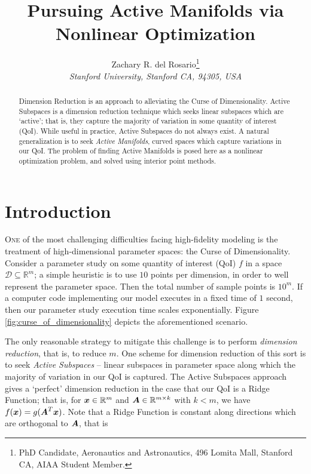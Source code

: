 \documentclass[]{aiaa-tc}%
\title{Pursuing Active Manifolds via Nonlinear Optimization}
\author{
  Zachary R. del Rosario\thanks{PhD Candidate, Aeronautics and Astronautics, 496 Lomita Mall, Stanford CA, AIAA Student Member.}\\
  {\normalsize\itshape
   Stanford University, Stanford CA, 94305, USA}\\
 }
\newcommand{\dom}{\mathcal{D}}
\begin{document}
\maketitle

\begin{abstract}
Dimension Reduction is an approach to alleviating the Curse of Dimensionality. Active Subspaces is a dimension reduction technique which seeks linear subspaces which are `active'; that is, they capture the majority of variation in some quantity of interest (QoI). While useful in practice, Active Subspaces do not always exist. A natural generalization is to seek \emph{Active Manifolds}, curved spaces which capture variations in our QoI. The problem of finding Active Manifolds is posed here as a nonlinear optimization problem, and solved using interior point methods.
\end{abstract}

\printnomenclature %

\section{Introduction} \label{sec:introduction}

\lettrine[nindent=0pt]{O}{ne} of the most challenging difficulties facing high-fidelity modeling is the treatment of high-dimensional parameter spaces: the Curse of Dimensionality. Consider a parameter study on some quantity of interest (QoI) $f$ in a space $\dom\subseteq\mathbb{R}^m$; a simple heuristic is to use $10$ points per dimension, in order to well represent the parameter space. Then the total number of sample points is $10^m$. If a computer code implementing our model executes in a fixed time of $1$ second, then our parameter study execution time scales exponentially. Figure \ref{fig:curse_of_dimensionality} depicts the aforementioned scenario.
\nomenclature{$\dom$}{Domain of $f$}%

The only reasonable strategy to mitigate this challenge is to perform \emph{dimension reduction}, that is, to reduce $m$. One scheme for dimension reduction of this sort is to seek \emph{Active Subspaces} -- linear subspaces in parameter space along which the majority of variation in our QoI is captured. \cite{constantine2015} The Active Subspaces approach gives a `perfect' dimension reduction in the case that our QoI is a Ridge Function; that is, for $\boldsymbol{x}\in\mathbb{R}^m$ and $\boldsymbol{A}\in\mathbb{R}^{m\times k}$ with $k<m$, we have $f(\boldsymbol{x})=g(\boldsymbol{A}^T\boldsymbol{x})$. Note that a Ridge Function is constant along directions which are orthogonal to $\boldsymbol{A}$, that is
\end{document}
